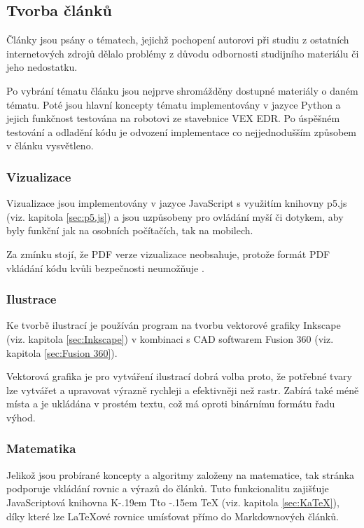 \documentclass[a4paper, 12pt]{article}
\makeatletter
\DeclareRobustCommand{\KaTeX}{%
  K\kern -.19em
  {\sbox \z@ T\vbox to\ht \z@ {\hbox{%
  \check@mathfonts
  \fontsize\sf@size\z@
  \selectfont A}%
  \vss}%
}\kern -.15em
\TeX}
\makeatother
\begin{document}
  \subsection{Tvorba článků} \label{sec:Tvorba článků}
  Články jsou psány o tématech, jejichž pochopení autorovi při studiu z ostatních internetových zdrojů dělalo problémy z důvodu odbornosti studijního materiálu či jeho nedostatku.


  Po vybrání tématu článku jsou nejprve shromážděny dostupné materiály o daném tématu. Poté jsou hlavní koncepty tématu implementovány v jazyce Python a jejich funkčnost testována na robotovi ze stavebnice VEX EDR. Po úspěšném testování a odladění kódu je odvození implementace co nejjednodušším způsobem v článku vysvětleno.


  \subsubsection{Vizualizace} \label{sec:Vizualizace}
  Vizualizace jsou implementovány v jazyce JavaScript s využitím knihovny p5.js (viz. kapitola \ref{sec:p5.js}) a jsou uzpůsobeny pro ovládání myší či dotykem, aby byly funkční jak na osobních počítačích, tak na mobilech.

  Za zmínku stojí, že PDF verze vizualizace neobsahuje, protože formát PDF vkládání kódu kvůli bezpečnosti neumožňuje \cite{history-of-pdf}.


  \subsubsection{Ilustrace} \label{sec:Ilustrace}
  Ke tvorbě ilustrací je používán program na tvorbu vektorové grafiky Inkscape (viz. kapitola \ref{sec:Inkscape}) v kombinaci s CAD softwarem Fusion 360 (viz. kapitola \ref{sec:Fusion 360}).

  Vektorová grafika je pro vytváření ilustrací dobrá volba proto, že potřebné tvary lze vytvářet a upravovat výrazně rychleji a efektivněji než rastr. Zabírá také méně místa a je ukládána v prostém textu, což má oproti binárnímu formátu řadu výhod.



  \subsubsection{Matematika} \label{sec:Matematika}
  Jelikož jsou probírané koncepty a algoritmy založeny na matematice, tak stránka podporuje vkládání rovnic a výrazů do článků. Tuto funkcionalitu zajišťuje JavaScriptová knihovna \KaTeX{} (viz. kapitola \ref{sec:KaTeX}), díky které lze \LaTeX ové rovnice umísťovat přímo do Markdownových článků.
\end{document}
